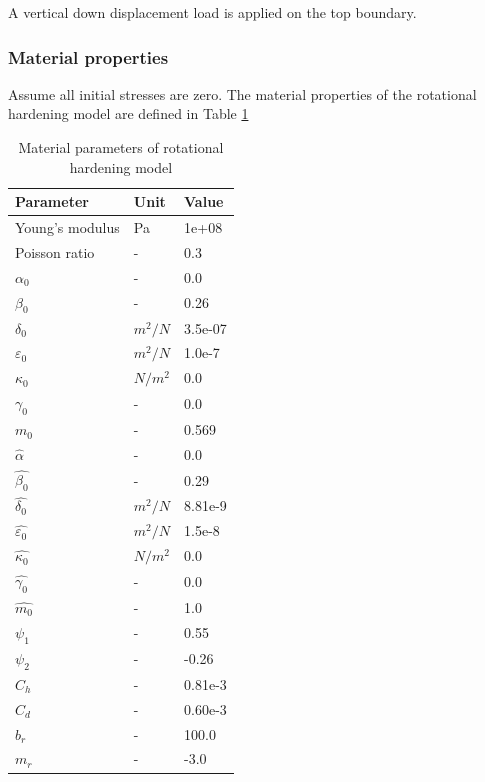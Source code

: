 A vertical down displacement load is applied on the top boundary.

\subsubsection*{Material properties}

Assume all initial stresses are zero. The material properties of the rotational hardening model
are defined in Table \ref{Tab_par_oedo}
\begin{table}[!htb]
\centering
\begin{tabular}{lll}
\hline \hline
Parameter   &  Unit  & Value\\
\hline
  Young's modulus &  Pa &  1e+08 \\
\hline
  Poisson ratio & - &  0.3 \\
\hline
  $\alpha_0$       &  -        & 0.0 \\
  $\beta_0$        &  -        & 0.26 \\
  $\delta_0$       &  $m^2/N$  & 3.5e-07\\
  $ \varepsilon_0$ &  $m^2/N$  & 1.0e-7\\
  $\kappa_0$       &  $N/m^2$  & 0.0  \\
  $\gamma_0$       &  -        & 0.0 \\
  $m_0$            &  -        & 0.569 \\
\hline
  $\hat {\alpha}$  &  -        & 0.0 \\
  $\hat {\beta_0}$ &  -        & 0.29\\
  $\hat{\delta_0}$ &  $m^2/N$  & 8.81e-9\\
  $\hat{\varepsilon_0}$&  $m^2/N$  & 1.5e-8 \\
  $\hat{\kappa_0}$ &  $N/m^2$  & 0.0  \\
  $\hat{\gamma_0}$ &  -        & 0.0 \\
  $\hat{m_0}$      &  -        & 1.0 \\
\hline
  $\psi_1$         &   -       & 0.55\\
  $\psi_2$         &  -        & -0.26\\
\hline
  $C_h$            &  -        & 0.81e-3\\
  $C_d$            &  -        & 0.60e-3\\
\hline
  $b_r$            &  -        & 100.0\\
  $m_r$            &  -        & -3.0\\
\hline \hline
\end{tabular}
\caption{\label{Tab_par_oedo}Material parameters of rotational hardening
model }
\end{table}

